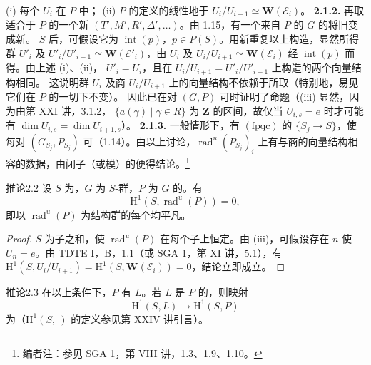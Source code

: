 (i) 每个 $U_i$ 在 $P$ 中；
(ii) $P$ 的定义的线性地于 $U_i/U_{i+1}\simeq\mathbf W(\mathcal E_i)$。
\textbf{2.1.2.} 再取适合于 $P$ 的一个新 $(T',M',R',\Delta',\ldots)$。由 1.15，有一个来自 $P$ 的 $G$ 的将旧变成新。 $S$ 后，可假设它为 $\operatorname{int}(p)$，$p\in P(S)$。用新重复以上构造，显然所得群 $U'_i$ 及 $U'_i/U'_{i+1}\simeq\mathbf W(\mathcal E'_i)$，由 $U_i$ 及 $U_i/U_{i+1}\simeq\mathbf W(\mathcal E_i)$ 经 $\operatorname{int}(p)$ 而得。由上述 (i)、(ii)，
$U'_i=U_i$，且在 $U_i/U_{i+1}=U'_i/U'_{i+1}$ 上构造的两个向量结构相同。
这说明群 $U_i$ 及商 $U_i/U_{i+1}$ 上的向量结构不依赖于所取（特别地，易见它们在 $P$ 的一切下不变）。
因此已在对 $(G,P)$ 可时证明了命题（(iii) 显然，因为由第 XXI 讲，3.1.2， $\{a(\gamma)\mid\gamma\in R\}$ 为 $\mathbf Z$ 的区间，故仅当 $U_{i,s}=e$ 时才可能有 $\dim U_{i,s}=\dim U_{i+1,s}$）。
\textbf{2.1.3.} 一般情形下，有 $(\mathrm{fpqc})$ 的 $\{S_j\to S\}$，使每对 $(G_{S_j},P_{S_j})$ 可（1.14）。由以上讨论，$\operatorname{rad}^{u}(P_{S_j})_i$ 上有与商的向量结构相容的数据，由闭子（或模）的便得结论。\footnote{编者注：参见 SGA 1，第 VIII 讲，1.3、1.9、1.10。}
\begin{SGAresult}{推论}{2.2}
设 $S$ 为，$G$ 为 $S$-群，$P$ 为 $G$ 的。有
\[\mathrm H^1(S,\operatorname{rad}^{u}(P))=0,\]
即以 $\operatorname{rad}^{u}(P)$ 为结构群的每个均平凡。
\end{SGAresult}
\begin{proof}
$S$ 为子之和，使 $\operatorname{rad}^{u}(P)$ 在每个子上恒定。由 (iii)，可假设存在 $n$ 使 $U_n=e$。由 TDTE I，B，1.1（或 SGA 1，第 XI 讲，5.1），有 $\mathrm H^1(S,U_i/U_{i+1})=\mathrm H^1(S,\mathbf W(\mathcal E_i))=0$，结论立即成立。
\end{proof}
\begin{SGAresult}{推论}{2.3}
在以上条件下，$P$ 有 $L$。若 $L$ 是 $P$ 的，则映射
\[\mathrm H^1(S,L)\longrightarrow\mathrm H^1(S,P)\]
为（$\mathrm H^1(S,\ )$ 的定义参见第 XXIV 讲引言）。
\end{SGAresult}
